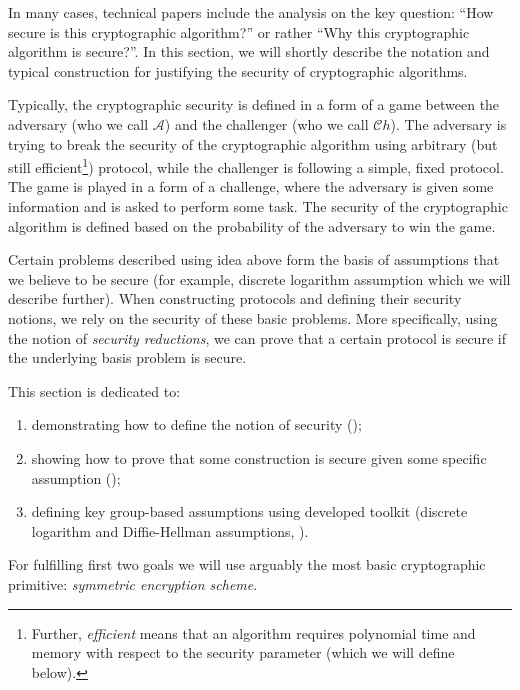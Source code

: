 \documentclass[../../book.tex]{subfiles}
\begin{document}
In many cases, technical papers include the analysis on the key question: ``How secure is this cryptographic algorithm?'' or rather ``Why this cryptographic algorithm is secure?''. 
In this section, we will shortly describe the notation and typical construction for justifying the security of cryptographic algorithms.

Typically, the cryptographic security is defined in a form of a game between the adversary (who we call $\mathcal{A}$) and the challenger (who we call $\mathcal{C}h$). 
The adversary is trying to break the security of the cryptographic algorithm using arbitrary (but still efficient\footnote{Further, \emph{efficient} means that an algorithm requires polynomial time and memory with respect to the security parameter (which we will define below).}) protocol, while the challenger is following a simple, fixed protocol. 
The game is played in a form of a challenge, where the adversary is given some information and is asked to perform some task. 
The security of the cryptographic algorithm is defined based on the probability of the adversary to win the game.

Certain problems described using idea above form the basis of assumptions that we believe to be secure (for example, discrete logarithm assumption which we will describe further).
When constructing protocols and defining their security notions, we rely on the security of these basic problems.
More specifically, using the notion of \emph{security reductions}, we can prove that a certain protocol is secure if the underlying basis problem is secure.

This section is dedicated to:
\begin{enumerate}
    \item demonstrating how to define the notion of security ();
    \item showing how to prove that some construction is secure given some specific assumption ();
    \item defining key group-based assumptions using developed toolkit (discrete logarithm and Diffie-Hellman assumptions, ).
\end{enumerate}

For fulfilling first two goals we will use arguably the most basic cryptographic primitive: \emph{symmetric encryption scheme}.
\end{document}
